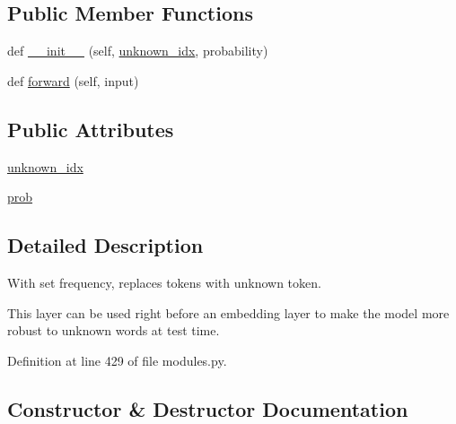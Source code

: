\subsection*{Public Member Functions}
\begin{DoxyCompactItemize}
\item 
def \hyperlink{classcontrollable__seq2seq_1_1modules_1_1UnknownDropout_a457306c1bd63cc7ee69c18d12ccc2c38}{\+\_\+\+\_\+init\+\_\+\+\_\+} (self, \hyperlink{classcontrollable__seq2seq_1_1modules_1_1UnknownDropout_a89674ff3d4854744a0f2671e474a42a2}{unknown\+\_\+idx}, probability)
\item 
def \hyperlink{classcontrollable__seq2seq_1_1modules_1_1UnknownDropout_a875d78f9d759c57eaa5d42aab22ecaeb}{forward} (self, input)
\end{DoxyCompactItemize}
\subsection*{Public Attributes}
\begin{DoxyCompactItemize}
\item 
\hyperlink{classcontrollable__seq2seq_1_1modules_1_1UnknownDropout_a89674ff3d4854744a0f2671e474a42a2}{unknown\+\_\+idx}
\item 
\hyperlink{classcontrollable__seq2seq_1_1modules_1_1UnknownDropout_a5305b89df485d6ab49f1037b4fa11449}{prob}
\end{DoxyCompactItemize}


\subsection{Detailed Description}
\begin{DoxyVerb}With set frequency, replaces tokens with unknown token.

This layer can be used right before an embedding layer to make the model
more robust to unknown words at test time.
\end{DoxyVerb}
 

Definition at line 429 of file modules.\+py.



\subsection{Constructor \& Destructor Documentation}
\mbox{\label{classcontrollable__seq2seq_1_1modules_1_1UnknownDropout_a457306c1bd63cc7ee69c18d12ccc2c38}} 
